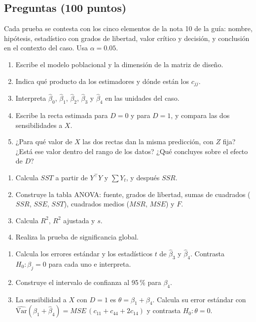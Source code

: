 \subsection*{Preguntas (100 puntos)}

Cada prueba se contesta con los cinco elementos de la nota 10 de la guía: nombre, hipótesis, estadístico con grados de libertad, valor crítico y decisión, y conclusión en el contexto del caso. Usa $\alpha=0.05$.

\begin{enumerate}
  \item Escribe el modelo poblacional y la dimensión de la matriz de diseño.
  \item Indica qué producto da los estimadores y dónde están los $c_{jj}$.
  \item Interpreta $\hat\beta_0$, $\hat\beta_1$, $\hat\beta_2$, $\hat\beta_3$ y $\hat\beta_4$ en las unidades del caso.
  \item Escribe la recta estimada para $D=0$ y para $D=1$, y compara las dos sensibilidades a $X$.
  \item ¿Para qué valor de $X$ las dos rectas dan la misma predicción, con $Z$ fija? ¿Está ese valor dentro del rango de los datos? ¿Qué concluyes sobre el efecto de $D$?
\end{enumerate}


\begin{enumerate}
  \item Calcula $SST$ a partir de $Y^\top Y$ y $\sum Y_t$, y después $SSR$.
  \item Construye la tabla ANOVA: fuente, grados de libertad, sumas de cuadrados ($SSR$, $SSE$, $SST$), cuadrados medios ($MSR$, $MSE$) y $F$.
  \item Calcula $R^2$, $R^2$ ajustada y $s$.
  \item Realiza la prueba de significancia global.
\end{enumerate}


\begin{enumerate}
  \item Calcula los errores estándar y los estadísticos $t$ de $\hat\beta_3$ y $\hat\beta_4$. Contrasta $H_0:\beta_j=0$ para cada uno e interpreta.
  \item Construye el intervalo de confianza al 95\,\% para $\beta_4$.
  \item La sensibilidad a $X$ con $D=1$ es $\theta=\beta_1+\beta_4$. Calcula su error estándar con $\widehat{\mathrm{Var}}(\hat\beta_1+\hat\beta_4)=MSE\,(c_{11}+c_{44}+2c_{14})$ y contrasta $H_0:\theta=0$.
\end{enumerate}



